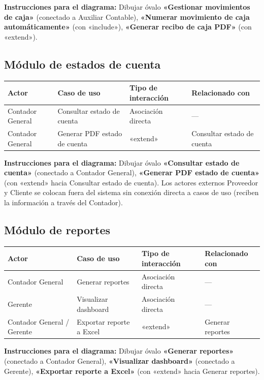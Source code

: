 \documentclass[stu]{apa7}
\begin{document}
\textbf{Instrucciones para el diagrama:}
Dibujar óvalo \textbf{«Gestionar movimientos de caja»} (conectado a Auxiliar Contable), \textbf{«Numerar movimiento de caja automáticamente»} (con «include»), \textbf{«Generar recibo de caja PDF»} (con «extend»).

\subsection{Módulo de estados de cuenta}

\begin{longtable}{|L{3cm}|L{5cm}|L{4cm}|L{3cm}|}
\hline
{}
\textbf{Actor} & \textbf{Caso de uso} & \textbf{Tipo de interacción} & \textbf{Relacionado con} \\
\hline
\endhead
Contador General & Consultar estado de cuenta & Asociación directa & --- \\
\hline
Contador General & Generar PDF estado de cuenta & «extend» & Consultar estado de cuenta \\
\hline
\end{longtable}

\textbf{Instrucciones para el diagrama:}
Dibujar óvalo \textbf{«Consultar estado de cuenta»} (conectado a Contador General), \textbf{«Generar PDF estado de cuenta»} (con «extend» hacia Consultar estado de cuenta). Los actores externos Proveedor y Cliente se colocan fuera del sistema sin conexión directa a casos de uso (reciben la información a trav\'es del Contador).

\subsection{Módulo de reportes}

\begin{longtable}{|L{3cm}|L{5cm}|L{4cm}|L{3cm}|}
\hline
{}
\textbf{Actor} & \textbf{Caso de uso} & \textbf{Tipo de interacción} & \textbf{Relacionado con} \\
\hline
\endhead
Contador General & Generar reportes & Asociación directa & --- \\
\hline
Gerente & Visualizar dashboard & Asociación directa & --- \\
\hline
Contador General / Gerente & Exportar reporte a Excel & «extend» & Generar reportes \\
\hline
\end{longtable}

\textbf{Instrucciones para el diagrama:}
Dibujar óvalo \textbf{«Generar reportes»} (conectado a Contador General), \textbf{«Visualizar dashboard»} (conectado a Gerente), \textbf{«Exportar reporte a Excel»} (con «extend» hacia Generar reportes).
\end{document}
